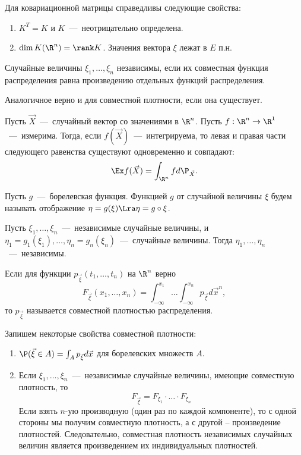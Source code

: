 \begin{proposition}
    Для ковариационной матрицы справедливы следующие свойства:
    \begin{enumerate}
        \item $K^T = K$ и $K$~---~неотрицательно определена.
        \item $\dim K(\R^n) = \rank K$. Значения вектора $\xi$ лежат в $E$ п.н.
    \end{enumerate}
\end{proposition}
\begin{definition}
    Случайные величины $\xi_1, \ldots, \xi_n$ независимы, если их совместная функция распределения равна произведению отдельных функций распределения.
\end{definition}
\begin{note}
    Аналогичное верно и для совместной плотности, если она существует.
\end{note}
\begin{theorem}
    Пусть $\vec{X}$~---~случайный вектор со значениями в $\R^n$. Пусть $f: \R^n \to \R^1$~---~измерима.
    Тогда, если $f(\vec{X})$~---~интегрируема, то левая и правая части следующего равенства существуют одновременно и совпадают:
    \[
        \Ex f(\vec{X}) = \int_{\R^n} fd\P_{\vec{X}}.
    \]
\end{theorem}
\begin{definition}
    Пусть $g$~---~борелевская функция.
    Функцией $g$ от случайной величины $\xi$ будем называть отображение $\eta = g(\xi) \Lra \eta = g \circ \xi$.
\end{definition}
\begin{theorem}
    Пусть $\xi_1, \ldots, \xi_n$~---~независимые случайные величины, и $\eta_1 = g_1(\xi_1), \ldots, \eta_n = g_n(\xi_n)$~---~случайные величины.
    Тогда $\eta_1, \ldots, \eta_n$~---~независимы.
\end{theorem}
\begin{definition}
    Если для функции $p_{\vec{\xi}}(t_1, \ldots, t_n)$ на $\R^n$ верно
    \[
        F_{\vec{\xi}}(x_1, \ldots, x_n) = \int_{-\infty}^{x_1}\ldots \int_{-\infty}^{x_n}p_{\vec{\xi}}d\vec{x}^n,
    \]
    то $p_{\vec{\xi}}$ называется совместной плотностью распределения.
\end{definition}
\begin{proposition}
    Запишем некоторые свойства совместной плотности:
    \begin{enumerate}
        \item $\P(\vec{\xi} \in A) = \int_A p_{\vec{\xi}}d\vec{x}$ для борелевских множеств $A$.
        \item Если $\xi_1, \ldots, \xi_n$~---~независимые случайные величины, имеющие совместную плотность, то
         \[F_{\vec{\xi}} = F_{\xi_1}\cdot \ldots \cdot F_{\xi_n}\]
        Если взять $n$-ую производную (один раз по каждой компоненте), то с одной стороны мы получим совместную плотность, а с другой -- произведение плотностей.
        Следовательно, совместная плотность независимых случайных величин является произведением их индивидуальных плотностей.
    \end{enumerate}
\end{proposition}
